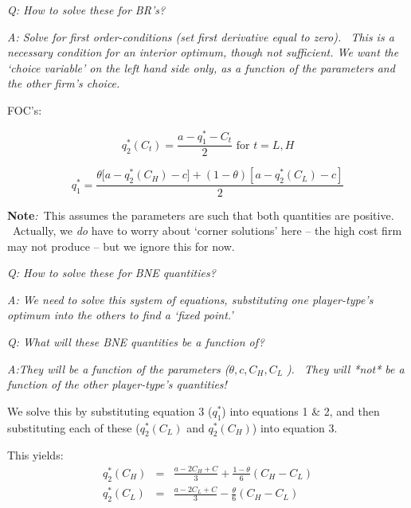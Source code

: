 \documentclass{article}
\begin{document}
\textit{Q: How to solve these for BR's?}\bigskip

\textit{A: Solve for first order-conditions (set first derivative equal to
zero). \ This is a necessary condition for an interior optimum, though not
sufficient. We want the `choice variable' on the left hand side only, as a
function of the parameters and the other firm's choice.}

\bigskip

FOC's:

\begin{equation}
q_{2}^{\ast }(C_{t})=\frac{a-q_{1}^{\ast }-C_{t}}{2}\text{ for }t=L,H 
\tag{1 \& 2}
\end{equation}

\begin{equation}
q_{1}^{\ast }=\frac{\theta \lbrack a-q_{2}^{\ast }(C_{H})-c]+(1-\theta
)[a-q_{2}^{\ast }(C_{L})-c]}{2}  \tag{3}
\end{equation}

\bigskip

\textbf{Note}\textit{:\ }This assumes the parameters are such that both
quantities are positive. \ Actually, we \textit{do }have to worry about
`corner solutions' here -- the high cost firm may not produce -- but we
ignore this for now.

\bigskip

\textit{Q: How to solve these for BNE quantities?}

\bigskip

\textit{A: We need to solve this system of equations, substituting one
player-type's optimum into the others to find a `fixed point.'}

\bigskip

\textit{Q: What will these BNE quantities be a function of?}

\bigskip

\textit{A:They will be a function of the parameters (}$\theta ,c,C_{H},C_{L}$%
\textit{). \ They will *not* be a function of the other player-type's
quantities!}

\bigskip 

We solve this by substituting equation 3 ($q_{1}^{\ast }$) into equations 1
\& 2, and then substituting each of these ($q_{2}^{\ast }(C_{L})$ and $%
q_{2}^{\ast }(C_{H})$) into equation 3. \ 

\bigskip

This yields:%
\begin{eqnarray*}
q_{2}^{\ast }(C_{H}) &=&\frac{a-2C_{H}+C}{3}+\frac{1-\theta }{6}(C_{H}-C_{L})
\\
q_{2}^{\ast }(C_{L}) &=&\frac{a-2C_{L}+C}{3}-\frac{\theta }{6}(C_{H}-C_{L})
\end{eqnarray*}
\end{document}
